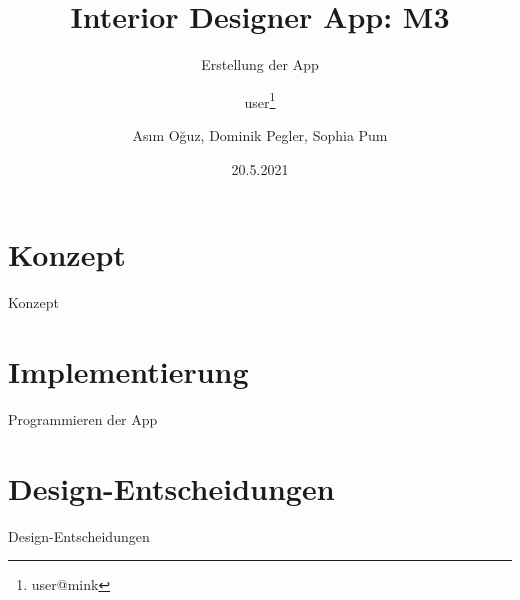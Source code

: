 \documentclass[presentation,bigger,aspectratio=169]{beamer}
\author{user\thanks{user@mink}}
\date{20.5.2021}
\title{Interior Designer App: M3}
\subtitle{Erstellung der App}
\author[A.Oğuz, D.Pegler, S.Pum]{Asım Oğuz, Dominik Pegler, Sophia Pum}
\institute{Universität Wien, Fakultät für Informatik (SS2021)}
\begin{document}
\maketitle

\section{Konzept}
\label{sec:org661a293}

\begin{frame}[label={sec:org37261d2}]{\vspace{2.2cm}\begin{center}\MakeUppercase{\insertsection}\end{center}}
\end{frame}

\begin{frame}[label={sec:org1d53cbf}]{Konzept}
\end{frame}

\section{Implementierung}
\label{sec:org291cb03}
\begin{frame}[label={sec:org858dbb1}]{\vspace{2.2cm}\begin{center}\MakeUppercase{\insertsection}\end{center}}
\end{frame}

\begin{frame}[label={sec:org1cd5182}]{Programmieren der App}
\end{frame}
\section{Design-Entscheidungen}
\label{sec:orgd4ed076}
\begin{frame}[label={sec:orgbe0bac8}]{\vspace{2.2cm}\begin{center}\MakeUppercase{\insertsection}\end{center}}
\end{frame}

\begin{frame}[label={sec:org8620d59}]{Design-Entscheidungen}
\end{frame}
\appendix
\end{document}
